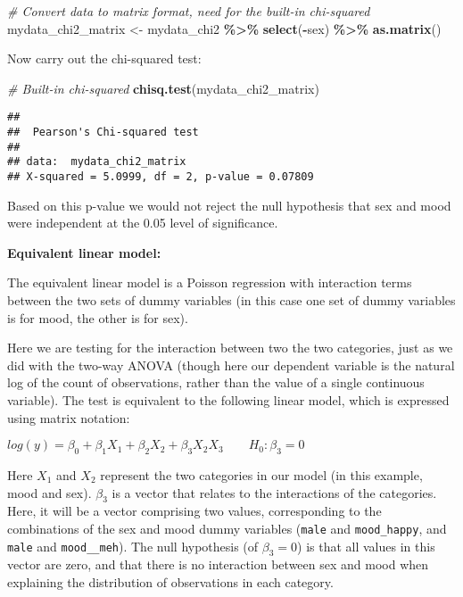\documentclass[
  12pt,
]{krantz}
\newenvironment{Shaded}{\begin{snugshade}}{\end{snugshade}}
\newcommand{\CommentTok}[1]{\textcolor[rgb]{0.56,0.35,0.01}{\textit{#1}}}
\newcommand{\KeywordTok}[1]{\textcolor[rgb]{0.13,0.29,0.53}{\textbf{#1}}}
\newcommand{\NormalTok}[1]{#1}
\newcommand{\OperatorTok}[1]{\textcolor[rgb]{0.81,0.36,0.00}{\textbf{#1}}}
\newcommand{\StringTok}[1]{\textcolor[rgb]{0.31,0.60,0.02}{#1}}
\begin{document}
\begin{Shaded}
\begin{Highlighting}[]
\CommentTok{\# Convert data to matrix format, need for the built{-}in chi{-}squared}
\NormalTok{mydata\_chi2\_matrix \textless{}{-}}\StringTok{ }\NormalTok{mydata\_chi2 }\OperatorTok{\%\textgreater{}\%}
\StringTok{  }\KeywordTok{select}\NormalTok{(}\OperatorTok{{-}}\NormalTok{sex) }\OperatorTok{\%\textgreater{}\%}
\StringTok{  }\KeywordTok{as.matrix}\NormalTok{()}
\end{Highlighting}
\end{Shaded}

Now carry out the chi-squared test:

\begin{Shaded}
\begin{Highlighting}[]
\CommentTok{\# Built{-}in chi{-}squared}
\KeywordTok{chisq.test}\NormalTok{(mydata\_chi2\_matrix)}
\end{Highlighting}
\end{Shaded}

\begin{verbatim}
## 
##  Pearson's Chi-squared test
## 
## data:  mydata_chi2_matrix
## X-squared = 5.0999, df = 2, p-value = 0.07809
\end{verbatim}

Based on this p-value we would not reject the null hypothesis that sex and mood were independent at the 0.05 level of significance.

\textbf{Equivalent linear model:}

The equivalent linear model is a Poisson regression with interaction terms between the two sets of dummy variables (in this case one set of dummy variables is for mood, the other is for sex).

Here we are testing for the interaction between two the two categories, just as we did with the two-way ANOVA (though here our dependent variable is the natural log of the count of observations, rather than the value of a single continuous variable). The test is equivalent to the following linear model, which is expressed using matrix notation:

\begin{center}

\(log(y) = \beta_0 + \beta_1 X_1 + \beta_2 X_2 + \beta_3 X_2 X_3 \qquad H_0: \beta_3 = 0\)

\end{center}

Here \(X_1\) and \(X_2\) represent the two categories in our model (in this example, mood and sex). \(\beta_3\) is a vector that relates to the interactions of the categories. Here, it will be a vector comprising two values, corresponding to the combinations of the sex and mood dummy variables (\texttt{male} and \texttt{mood\_happy}, and \texttt{male} and \texttt{mood\_\_meh}). The null hypothesis (of \(\beta_3 = 0\)) is that all values in this vector are zero, and that there is no interaction between sex and mood when explaining the distribution of observations in each category.
\end{document}
